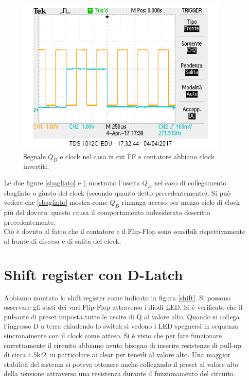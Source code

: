 \documentclass[10pt,a4paper]{article}
\begin{document}
\begin{figure}[!htb]
\centering
\includegraphics[scale=1.0]{clockgiusto.png}
\caption{Segnale $Q_D$ e clock nel caso in cui FF e contatore abbiano clock invertiti.\label{giusto}}
\end{figure}

Le due figure \ref{sbagliato} e \ref{giusto} mostrano l'uscita $Q_D$ nel caso di collegamento sbagliato o giusto del clock (secondo quanto detto precedentemente). Si può vedere che \ref{sbagliato} mostra come $Q_D$ rimanga acceso per mezzo ciclo di clock più del dovuto: questo causa il comportamento indesiderato descritto precedentemente.\\
Ciò è dovuto al fatto che il contatore e il Flip-Flop sono sensibili rispettivamente al fronte di discesa e di salita del clock.\\

\section{Shift register con D-Latch}
Abbiamo montato lo shift register come indicato in figura \ref{shift}. Si possono osservare gli stati dei vari Flip-Flop attraverso i diodi LED. Si è verificato che il pulsante di preset imposta tutte le uscite di Q al valore alto. Quando si collega l'ingresso D a terra chiudendo lo switch si vedono i LED spegnersi in sequenza sincronamente con il clock come atteso. Si è visto che per fare funzionare correttamente il circuito abbiamo avuto bisogno di inserire resistenze di pull-up di circa $1.5 \mbox{k}\Omega$, in particolare ai clear per tenerli al valore alto. Una maggior stabilità del sistema si poteva ottenere anche collegando il preset al valore alto della tensione attraverso una resistenza durante il funzionamento del circuito.
\end{document}
